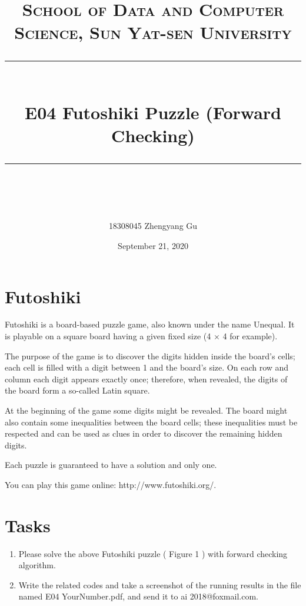 \documentclass[a4paper, 11pt]{article}
\title{	
\normalfont \normalsize
\textsc{School of Data and Computer Science, Sun Yat-sen University} \\ [25pt] %
\rule{\textwidth}{0.5pt} \\[0.4cm] %
\huge  E04 Futoshiki Puzzle (Forward Checking) \\ %
\rule{\textwidth}{2pt} \\[0.5cm] %
\author{18308045 Zhengyang Gu}
\date{\normalsize September 21, 2020} 
}
\begin{document}
\maketitle
\tableofcontents
\newpage

\section{Futoshiki}
Futoshiki is a board-based puzzle game, also known under the name Unequal. It is playable on a square board having a given fixed size (4 × 4 for example).

The purpose of the game is to discover the digits hidden inside the board’s cells; each cell is filled with a digit between 1 and the board’s size. On each row and column each digit appears exactly once; therefore, when revealed, the digits of the board form a so-called Latin square.

At the beginning of the game some digits might be revealed. The board might also contain some inequalities between the board cells; these inequalities must be respected and can be used as clues in order to discover the remaining hidden digits.

Each puzzle is guaranteed to have a solution and only one.

You can play this game online: http://www.futoshiki.org/.


\section{Tasks}
\begin{enumerate}

\item  Please solve the above Futoshiki puzzle ( Figure 1 ) with forward checking algorithm.

\item  Write the related codes and take a screenshot of the running results in the file named E04 YourNumber.pdf, and send it to ai 2018@foxmail.com.

\end{enumerate}
\end{document}
